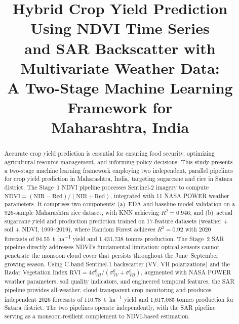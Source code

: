 \documentclass[conference]{IEEEtran}
\begin{document}
\title{Hybrid Crop Yield Prediction Using NDVI Time Series\\
and SAR Backscatter with Multivariate Weather Data:\\
A Two-Stage Machine Learning Framework for\\
Maharashtra, India}

\author{
}

\maketitle

\begin{abstract}
Accurate crop yield prediction is essential for ensuring food security,
optimizing agricultural resource management, and informing policy decisions.
This study presents a two-stage machine learning framework employing two
independent, parallel pipelines for crop yield prediction in Maharashtra,
India, targeting sugarcane and rice in Satara district. The Stage~1 NDVI
pipeline processes Sentinel-2 imagery to compute
$\text{NDVI}=(\text{NIR}-\text{Red})/(\text{NIR}+\text{Red})$, integrated
with 11 NASA POWER weather parameters. It comprises two components: (a)~EDA
and baseline model validation on a 926-sample Maharashtra rice dataset, with
KNN achieving $R^2 = 0.946$; and (b)~actual sugarcane yield and production
prediction trained on 17-feature datasets (weather + soil + NDVI, 1999--2019),
where Random Forest achieves $R^2 = 0.92$ with 2020 forecasts of
\SI{94.55}{\tonne\per\hectare} yield and 1{,}431{,}738 tonnes production.
The Stage~2 SAR pipeline directly addresses NDVI's fundamental limitation:
optical sensors cannot penetrate the monsoon cloud cover that persists
throughout the June--September growing season. Using C-band Sentinel-1
backscatter (VV, VH polarizations) and the Radar Vegetation Index
$\text{RVI}=4\sigma^0_{VH}/(\sigma^0_{VV}+\sigma^0_{VH})$, augmented with
NASA POWER weather parameters, soil quality indicators, and engineered
temporal features, the SAR pipeline provides all-weather, cloud-transparent
crop monitoring and produces independent 2026 forecasts of \SI{110.78}{\tonne\per\hectare}
yield and 1{,}617{,}085 tonnes production for Satara district. The two
pipelines operate independently, with the SAR pipeline serving as a
monsoon-resilient complement to NDVI-based estimation.
\end{abstract}
\end{document}
